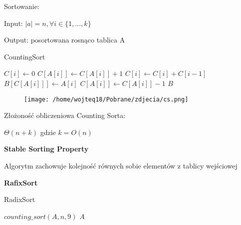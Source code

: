 \documentclass{article}
\begin{document}
    Sortowanie: \par
    Input: $|a| = n, \forall i \in \{1, ..., k\}$ \par
    Output: posortowana rosnąco tablica A \par

    \begin{algorithm}[H]
        \caption{CountingSort}
        \label{alg:countingsort}
        \begin{algorithmic}[1]
                    \State $C[i] \gets 0$
                \EndFor
                    \State $C[A[i]] \gets C[A[i]] + 1$
                \EndFor
                    \State $C[i] \gets C[i] + C[i - 1]$
                \EndFor
                    \State $B[C[A[i]]] \gets A[i]$
                    \State $C[A[i]] \gets C[A[i]] - 1$
                \EndFor
                \State \Return $B$
            \EndProcedure
        \end{algorithmic}
    \end{algorithm} \par

    \begin{figure}[H]
        \centering
        \texttt{[image: /home/wojteq18/Pobrane/zdjecia/cs.png]}
        \label{fig:example_image}
    \end{figure} \par

    Złożoność obliczeniowa Counting Sorta: \par
    $\Theta (n + k)$ gdzie $k = O(n)$ \par

    \vspace{1\baselineskip}

    \textbf{Stable Sorting Property} \par

    Algorytm zachowuje kolejność równych sobie elementów z tablicy wejściowej

    \vspace{5\baselineskip}

    \textbf{RafixSort} \par

    \begin{algorithm}[H]
        \caption{RadixSort}
        \label{alg:radixsort}
        \begin{algorithmic}[1]
                    \State $counting\_sort(A, n, 9)$
                \EndFor
                \State \Return $A$
            \EndProcedure
        \end{algorithmic}
    \end{algorithm} \par

    
    








    
\end{document}
